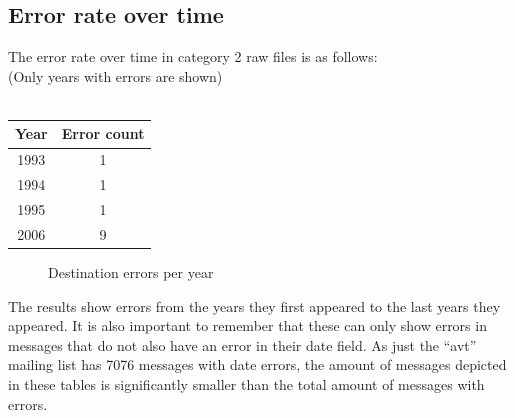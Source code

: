 \documentclass[a4paper,english]{report}
\begin{document}
\subsection{Error rate over time }

The error rate over time in category 2 raw files is as follows:\\
(Only years with errors are shown)\\\\

\begin{center}
 \begin{tabular}{|c | c|}
 \hline
Year& Error count \\ [0.5ex]
 \hline\hline
 1993 & 1\\
\hline
1994 & 1\\
\hline
1995 & 1\\
\hline
2006 & 9\\
\hline


\end{tabular}
\end{center}

\begin{figure}[H]
\centering
{}
\caption{Destination errors per year}
\end{figure}


The results show errors from the years they first appeared to the last years they appeared. It is also important to remember that these can only show errors in messages that do not also have an error in their date field. As just the “avt” mailing list has 7076 messages with date errors, the amount of messages depicted in these tables is significantly smaller than the total amount of messages with errors.\\
\end{document}
